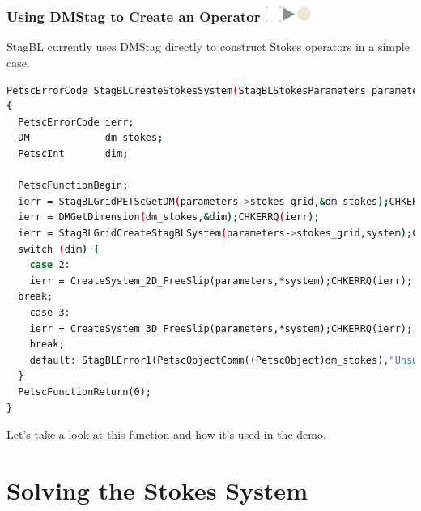 \documentclass{beamer}
\newcommand\frametitlelogo[1]{\frametitle{#1\hspace{0pt plus 1 filll} \includegraphics[width=42pt]{logo_slides}}}
\begin{document}
\begin{frame}[fragile]
  \frametitlelogo{Using DMStag to Create an Operator}
StagBL currently uses DMStag directly to construct Stokes operators in a simple case.
\begin{lstlisting}[language=bash,basicstyle=\tiny\ttfamily]
% From src/stokes/stokes.c
PetscErrorCode StagBLCreateStokesSystem(StagBLStokesParameters parameters, StagBLSystem *system)
{
  PetscErrorCode ierr;
  DM             dm_stokes;
  PetscInt       dim;

  PetscFunctionBegin;
  ierr = StagBLGridPETScGetDM(parameters->stokes_grid,&dm_stokes);CHKERRQ(ierr);
  ierr = DMGetDimension(dm_stokes,&dim);CHKERRQ(ierr);
  ierr = StagBLGridCreateStagBLSystem(parameters->stokes_grid,system);CHKERRQ(ierr);
  switch (dim) {
    case 2:
    ierr = CreateSystem_2D_FreeSlip(parameters,*system);CHKERRQ(ierr);
  break;
    case 3:
    ierr = CreateSystem_3D_FreeSlip(parameters,*system);CHKERRQ(ierr);
    break;
    default: StagBLError1(PetscObjectComm((PetscObject)dm_stokes),"Unsupported dimension %D",dim);
  }
  PetscFunctionReturn(0);
}
\end{lstlisting}
Let's take a look at this function and how it's used in the demo.
\end{frame}

\section{Solving the Stokes System}
\end{document}
